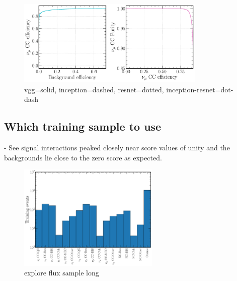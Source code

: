 \begin{figure} %
    \includegraphics[width=0.8\textwidth]{diagrams/7-cvn/chipsnet/arch_numu_comp_curves.pdf}
    \caption[arch numu comp curves short]
    {vgg=solid, inception=dashed, resnet=dotted, inception-resnet=dot-dash}
    \label{fig:arch_numu_comp_curves}
\end{figure}

\subsection{Which training sample to use} %
\label{sec:cvn_baseline_sample} %

- See signal interactions peaked closely near score values of unity and the backgrounds lie close
to the zero score as expected.

\begin{figure} %
    \includegraphics[width=0.6\textwidth]{diagrams/7-cvn/chipsnet/explore_flux_sample.pdf}
    \caption[explore flux sample short]
    {explore flux sample long}
    \label{fig:explore_flux_sample}
\end{figure}


